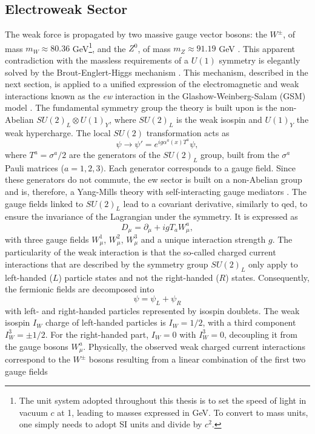 \subsection{Electroweak Sector}
The weak force is propagated by two massive gauge vector bosons: the $W^{\pm}$, of mass $m_W \approx 80.36$ GeV\footnote{The unit system adopted throughout this thesis is to set the speed of light in vacuum $c$ at 1, leading to masses expressed in GeV. To convert to mass units, one simply needs to adopt SI units and divide by $c^2$.}, and the $Z^0$, of mass $m_Z \approx 91.19$ GeV \cite{Tanabashi:2018oca}. This apparent contradiction with the massless requirements of a $U(1)$ symmetry is elegantly solved by the Brout-Englert-Higgs mechanism \cite{Englert:1964et, PhysRevLett.13.508}. This mechanism, described in the next section, is applied to a unified expression of the electromagnetic and weak interactions known as the \textit{\gls{ew}} interaction in the Glashow-Weinberg-Salam (GSM) model \cite{GLASHOW1961579, PhysRevLett.19.1264, Salam:1968rm}. The fundamental symmetry group the theory is built upon is the non-Abelian $SU(2)_L \otimes U(1)_Y$, where $SU(2)_L$ is the weak isospin and $U(1)_Y$ the weak hypercharge. The local $SU(2)$ transformation acts as
\begin{equation}\label{eq-GaugeSU2}
    \psi \rightarrow \psi' = e^{i g \alpha^a(x) T^a } \psi,
\end{equation}
where $T^a = \sigma^a / 2$ are the generators of the $SU(2)_L$ group, built from the $\sigma^a$ Pauli matrices ($a = 1, 2, 3)$. Each generator corresponds to a gauge field. Since these generators do not commute, the \gls{ew} sector is built on a non-Abelian group and is, therefore, a Yang-Mills theory with self-interacting gauge mediators \cite{PhysRev.96.191}. The gauge fields linked to $SU(2)_L$ lead to a covariant derivative, similarly to \gls{qed}, to ensure the invariance of the Lagrangian under the symmetry. It is expressed as
\begin{equation}\label{eq-CovDerSU2}
   D_{\mu}  = \partial_{\mu} + igT_a W_{\mu}^a,
\end{equation}
with three gauge fields $W_{\mu}^1$, $W_{\mu}^2$, $W_{\mu}^3$ and a unique interaction strength $g$. The particularity of the weak interaction is that the so-called charged current interactions that are described by the symmetry group $SU(2)_L$ only apply to left-handed ($L$) particle states and not the right-handed ($R$) states. Consequently, the fermionic fields are decomposed into \[\psi = \psi_L + \psi_R\] with left- and right-handed particles represented by isospin doublets. The weak isospin $I_W$ charge of left-handed particles is $I_W = 1/2$, with a third component $I_W^3 = \pm  1/2$. For the right-handed part, $I_W = 0$ with $I_W^3 = 0$, decoupling it from the gauge bosons $W_{\mu}^a$. Physically, the observed weak charged current interactions correspond to the $W^{\pm}$ bosons resulting from a linear combination of the first two gauge fields
